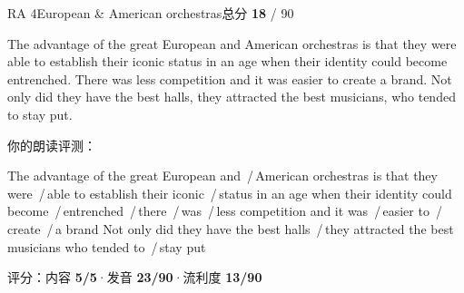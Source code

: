 \documentclass[11pt]{article}
\newcommand{\sfull}[1]{\textcolor{cFix}{\bfseries #1}}     %
\newcommand{\spart}[1]{\textcolor{cPartial}{\bfseries #1}} %
\newcommand{\szero}[1]{\textcolor{cWrong}{\bfseries #1}}   %
\newcommand{\sg}[1]{\textcolor{cSpkGood}{#1}}   %
\newcommand{\sy}[1]{\textcolor{cSpkOk}{#1}}     %
\newcommand{\sr}[1]{\textcolor{cSpkBad}{#1}}    %
\newcommand{\pse}{{\color{gray}\,/\,}}          %
\begin{document}
\begin{qblock}{RA 4\quad European \& American orchestras}{总分 \textcolor{cAccent}{\bfseries 18} / 90}
\begin{promptbox}
The advantage of the great European and American orchestras is that they were able to establish their iconic status in an age when their identity could become entrenched. There was less competition and it was easier to create a brand. Not only did they have the best halls, they attracted the best musicians, who tended to stay put.
\end{promptbox}
\smallskip\par{\footnotesize\color{gray}你的朗读评测：}
\begin{asrbox}
\sg{The advantage} \sg{of the great} \sy{European} \sy{and} \pse \sy{American orchestras} \sg{is that they were} \pse \sg{able to establish their} \sy{iconic} \pse \sg{status in an age when their identity could become} \pse \sr{entrenched} \pse \sy{there} \pse \sy{was} \pse \sy{less competition} \sg{and it} \sg{was} \pse \sg{easier to} \pse \sy{create} \pse \sy{a brand} \sg{Not only did they} \sg{have the best halls} \pse \sy{they} \sr{attracted} \sg{the best musicians who} \sg{tended to} \pse \sg{stay put}
\end{asrbox}
{\small 评分：内容 \sfull{5/5}\quad·\quad 发音 \spart{23/90}\quad·\quad 流利度 \szero{13/90}}
\end{qblock}
\end{document}
